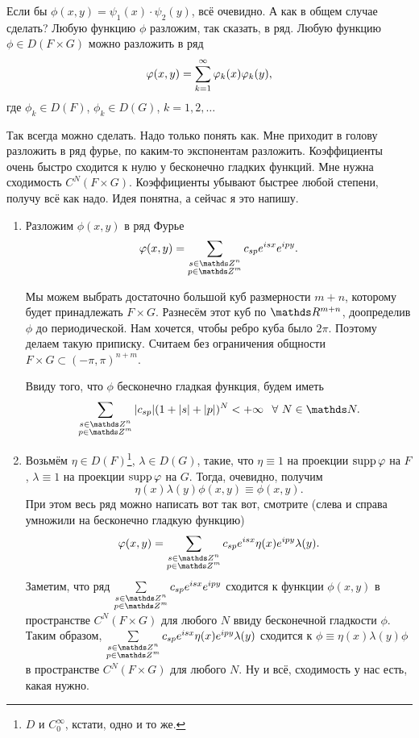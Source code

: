 \begin{Proof}
  Если бы $\phi(x,y) = \psi_1(x)\cdot \psi_2(y)$, всё очевидно. А как в общем случае сделать? Любую функцию $\phi$ разложим, так сказать, в ряд. Любую функцию $\phi\in D(F\times G)$ можно разложить в ряд
\[\varphi(x,y) = \sum\limits_{{k}={1}}^\infty {\varphi}_{k}(x)\varphi_k(y),\]
где $\phi_k\in D(F)$, $\phi_k\in D(G)$, $k=1,2,\ldots$

Так всегда можно сделать. Надо только понять как. Мне приходит в голову разложить в ряд фурье, по каким-то экспонентам разложить. Коэффициенты очень быстро сходится к нулю у бесконечно гладких функций. Мне нужна сходимость $C^N(F\times G)$. Коэффициенты убывают быстрее любой степени, получу всё как надо. Идея понятна, а сейчас я это напишу.

\begin{enumerate}
\item Разложим $\phi(x,y)$ в ряд Фурье
\[
\phi(x,y) = \sum\limits_{\substack{s\in\Z^n\\ p\in\Z^m}}c_{sp} e^{isx}e^{ipy}.
\]

Мы можем выбрать достаточно большой куб размерности $m+n$, которому будет принадлежать $F\times G$. Разнесём этот куб по $\R^{m+n}$, доопределив $\phi$ до периодической. Нам хочется, чтобы ребро куба было $2\pi$. Поэтому делаем такую приписку. Считаем без ограничения общности $F\times G\subset (-\pi,\pi)^{n+m}$.

Ввиду того, что $\phi$ бесконечно гладкая функция, будем иметь
\[\sum\limits_{\substack{s\in\Z^n\\ p\in\Z^m}} |c_{sp}|(1+|s|+|p|)^N<+\infty\pau \forall\ N\in\N.\]

\item  Возьмём $\eta\in D(F) $\footnote{$D$ и $C_0^{\infty}$, кстати, одно и то же.}, $\lambda\in D(G)$, такие, что $\eta\equiv 1$ на проекции $\operatorname{supp} \varphi$ на $F$, $\lambda\equiv 1$ на проекции $\operatorname{supp} \varphi$ на $G$. Тогда, очевидно, получим
\[ \eta(x)\lambda(y)\phi(x,y)\equiv \phi(x,y).\]
При этом весь ряд можно написать вот так вот, смотрите (слева и справа умножили на бесконечно гладкую функцию)
\[
  \phi(x,y) = \sum\limits_{\substack{s\in\Z^n\\ p\in\Z^m}}c_{sp} e^{isx}\eta(x)e^{ipy}\lambda(y).
\]
Заметим, что ряд $\sum\limits_{\substack{s\in\Z^n\\ p\in\Z^m}}c_{sp} e^{isx}e^{ipy}$ сходится к функции $\phi(x,y)$ в пространстве $C^N(F\times G)$ для любого $N$ ввиду бесконечной гладкости $\phi$. Таким образом, $\sum\limits_{\substack{s\in\Z^n\\ p\in\Z^m}}c_{sp} e^{isx}\eta(x)e^{ipy}\lambda(y)$ сходится к $\phi\equiv \eta(x)\lambda(y)\phi$ в пространстве $C^N(F\times G)$ для любого $N$. Ну и всё, сходимость у нас есть, какая нужно.


\end{enumerate}
\end{Proof}
